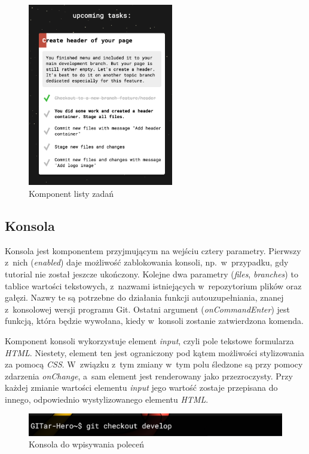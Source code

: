 \documentclass[12pt,a4paper,polish,thesis]{dcsbook}
\begin{document}
{	\begin{figure}[h]
		\centering
		\includegraphics[height=8cm]{component-task-list}
		\caption{Komponent listy zadań}
		\label{fig:task-list}
	\end{figure}

	\subsection{Konsola}

	Konsola jest komponentem przyjmującym na wejściu cztery parametry. Pierwszy z~nich (\textit{enabled}) daje możliwość zablokowania konsoli, np.~w~przypadku, gdy tutorial nie został jeszcze ukończony. Kolejne dwa parametry (\textit{files}, \textit{branches}) to tablice wartości tekstowych, z~nazwami istniejących w~repozytorium plików oraz gałęzi. Nazwy te są potrzebne do działania funkcji autouzupełniania, znanej z~konsolowej wersji programu Git. Ostatni argument (\textit{onCommandEnter}) jest funkcją, która będzie wywołana, kiedy w~konsoli zostanie zatwierdzona komenda.

	Komponent konsoli wykorzystuje element \textit{input}, czyli pole tekstowe formularza \textit{HTML}. Niestety, element ten jest ograniczony pod kątem możliwości stylizowania za pomocą \textit{CSS}. W~związku z~tym zmiany w~tym polu śledzone są przy pomocy zdarzenia \textit{onChange}, a~sam element jest renderowany jako przezroczysty. Przy każdej zmianie wartości elementu \textit{input} jego wartość zostaje przepisana do innego, odpowiednio wystylizowanego elementu \textit{HTML}.

	\begin{figure}[h]
		\centering
		\includegraphics[width=15cm]{component-console}
		\caption{Konsola do wpisywania poleceń}
		\label{fig:console}
	\end{figure}

}
\end{document}
